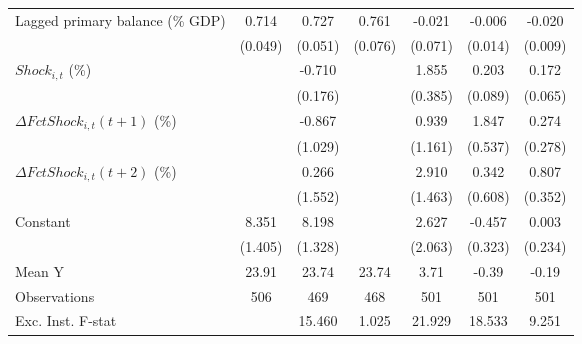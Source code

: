 {\begin{tabular}{l*{6}{c}}
\addlinespace
Lagged primary balance (\% GDP)&       0.714\sym{***}&       0.727\sym{***}&       0.761\sym{***}&      -0.021         &      -0.006         &      -0.020\sym{**} \\
                    &     (0.049)         &     (0.051)         &     (0.076)         &     (0.071)         &     (0.014)         &     (0.009)         \\
\addlinespace
$ Shock_{i,t}$ (\%) &                     &      -0.710\sym{***}&                     &       1.855\sym{***}&       0.203\sym{**} &       0.172\sym{**} \\
                    &                     &     (0.176)         &                     &     (0.385)         &     (0.089)         &     (0.065)         \\
\addlinespace
$ \Delta FctShock_{i,t}(t+1)$ (\%)&                     &      -0.867         &                     &       0.939         &       1.847\sym{***}&       0.274         \\
                    &                     &     (1.029)         &                     &     (1.161)         &     (0.537)         &     (0.278)         \\
\addlinespace
$ \Delta FctShock_{i,t}(t+2)$ (\%)&                     &       0.266         &                     &       2.910\sym{*}  &       0.342         &       0.807\sym{**} \\
                    &                     &     (1.552)         &                     &     (1.463)         &     (0.608)         &     (0.352)         \\
\addlinespace
Constant            &       8.351\sym{***}&       8.198\sym{***}&                     &       2.627         &      -0.457         &       0.003         \\
                    &     (1.405)         &     (1.328)         &                     &     (2.063)         &     (0.323)         &     (0.234)         \\
\midrule
Mean Y              &       23.91         &       23.74         &       23.74         &        3.71         &       -0.39         &       -0.19         \\
Observations        &         506         &         469         &         468         &         501         &         501         &         501         \\
Exc. Inst. F-stat   &                     &      15.460         &       1.025         &      21.929         &      18.533         &       9.251         \\
\bottomrule
\end{tabular}
}
